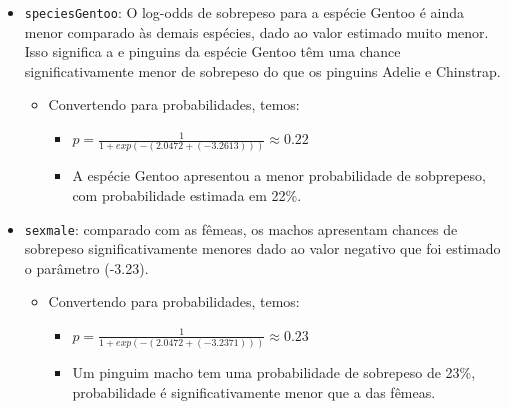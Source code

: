 \documentclass[
]{book}
\providecommand{\tightlist}{%
  \setlength{\itemsep}{0pt}\setlength{\parskip}{0pt}}
\begin{document}
\begin{itemize}
\tightlist
\item
  \texttt{speciesGentoo}: O log-odds de sobrepeso para a espécie Gentoo é ainda menor comparado às demais espécies, dado ao valor estimado muito menor. Isso significa a e pinguins da espécie Gentoo têm uma chance significativamente menor de sobrepeso do que os pinguins Adelie e Chinstrap.

  \begin{itemize}
  \tightlist
  \item
    Convertendo para probabilidades, temos:

    \begin{itemize}
    \tightlist
    \item
      \(p = \frac{1}{1+exp(-(2.0472 + (-3.2613)))}  \approx 0.22\)
    \item
      A espécie Gentoo apresentou a menor probabilidade de sobprepeso, com probabilidade estimada em 22\%.
    \end{itemize}
  \end{itemize}
\end{itemize}

\begin{itemize}
\tightlist
\item
  \texttt{sexmale}: comparado com as fêmeas, os machos apresentam chances de sobrepeso significativamente menores dado ao valor negativo que foi estimado o parâmetro (-3.23).

  \begin{itemize}
  \tightlist
  \item
    Convertendo para probabilidades, temos:

    \begin{itemize}
    \tightlist
    \item
      \(p = \frac{1}{1+exp(-(2.0472 + (-3.2371)))}  \approx 0.23\)
    \item
      Um pinguim macho tem uma probabilidade de sobrepeso de 23\%, probabilidade é significativamente menor que a das fêmeas.
    \end{itemize}
  \end{itemize}
\end{itemize}
\end{document}
